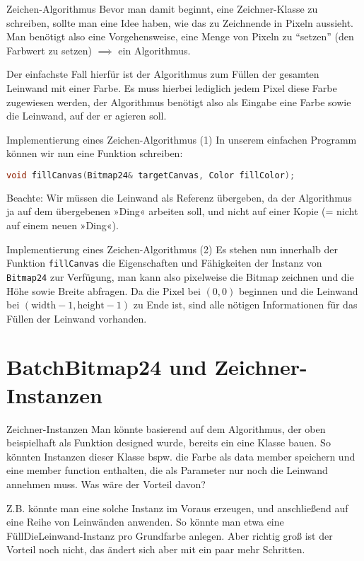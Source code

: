 \begin{frame}{Zeichen-Algorithmus}
	Bevor man damit beginnt, eine Zeichner-Klasse zu schreiben, sollte man eine Idee haben, wie das zu Zeichnende in Pixeln aussieht. Man benötigt also eine Vorgehensweise, eine Menge von Pixeln zu \enquote{setzen} (den Farbwert zu setzen) $\implies$ ein Algorithmus.
	
	\pause
	\vspace{1em}
	
	Der einfachste Fall hierfür ist der Algorithmus zum Füllen der gesamten Leinwand mit einer Farbe. Es muss hierbei lediglich jedem Pixel diese Farbe zugewiesen werden, der Algorithmus benötigt also als Eingabe eine Farbe sowie die Leinwand, auf der er agieren soll.
\end{frame}

\begin{frame}[fragile]{Implementierung eines Zeichen-Algorithmus (1)}
	In unserem einfachen Programm können wir nun eine Funktion schreiben:
	\begin{lstlisting}[language=C++]
		void fillCanvas(Bitmap24& targetCanvas, Color fillColor);
	\end{lstlisting}
	
	\vspace{1em}
	Beachte: Wir müssen die Leinwand als Referenz übergeben, da der Algorithmus ja auf dem übergebenen »Ding« arbeiten soll, und nicht auf einer Kopie (= nicht auf einem neuen »Ding«).
\end{frame}

\begin{frame}[fragile]{Implementierung eines Zeichen-Algorithmus (2)}
	Es stehen nun innerhalb der Funktion \verb|fillCanvas| die Eigenschaften und Fähigkeiten der Instanz von \verb|Bitmap24| zur Verfügung, man kann also pixelweise die Bitmap zeichnen und die Höhe sowie Breite abfragen. Da die Pixel bei $(0, 0)$ beginnen und die Leinwand bei $(\text{width}-1, \text{height}-1)$ zu Ende ist, sind alle nötigen Informationen für das Füllen der Leinwand vorhanden.
\end{frame}


\section{BatchBitmap24 und Zeichner-Instanzen}

\begin{frame}{Zeichner-Instanzen}
	Man könnte basierend auf dem Algorithmus, der oben beispielhaft als Funktion designed wurde, bereits ein eine Klasse bauen. So könnten Instanzen dieser Klasse bspw. die Farbe als data member speichern und eine member function enthalten, die als Parameter nur noch die Leinwand annehmen muss. Was wäre der Vorteil davon?
	
	\pause
	\vspace{1em}
	
	Z.B. könnte man eine solche Instanz im Voraus erzeugen, und anschließend auf eine Reihe von Leinwänden anwenden. So könnte man etwa eine FüllDieLeinwand-Instanz pro Grundfarbe anlegen. Aber richtig groß ist der Vorteil noch nicht, das ändert sich aber mit ein paar mehr Schritten.
\end{frame}

